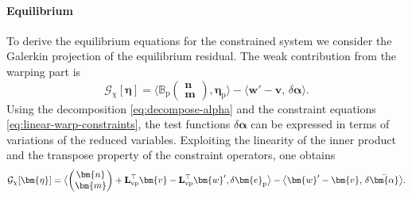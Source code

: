 \paragraph{Equilibrium}

To derive the equilibrium equations for the constrained system we consider the Galerkin projection of the equilibrium residual.
The weak contribution from the warping part is
\begin{equation*}
  \mathcal{G}_{\chi}[\bm{\eta}]
    = \bigl\langle \mathbb{B}_{\mathrm{p}}
        \begin{pmatrix} \bm{n} \\ \bm{m} \end{pmatrix},
        \bm{\eta}_{\mathrm{p}}\bigr\rangle
      - \bigl\langle \bm{w}' - \bm{v} ,\, \delta\bm{\alpha} \bigr\rangle .
\end{equation*}
Using the decomposition \eqref{eq:decompose-alpha} and the constraint equations
\eqref{eq:linear-warp-constraints}, the test functions $\delta\bm{\alpha}$ can be expressed in terms of variations of the reduced variables.
Exploiting the linearity of the inner product and the transpose property of the constraint operators, one obtains
\begin{equation*}
  \mathcal{G}_{\chi}[\bm{\eta}]
    =
    \bigl\langle
      \begin{pmatrix} \bm{n} \\ \bm{m} \end{pmatrix}
      + \mathbf{L}_{\rm vp}^{\top}\bm{v}
      - \mathbf{L}_{\rm vp}^{\top}\bm{w}' ,
      \delta\bm{e}_{\mathrm{p}}
    \bigr\rangle
    - \bigl\langle \bm{w}' - \bm{v} ,\, \delta\bar{\bm{\alpha}} \bigr\rangle .
\end{equation*}

